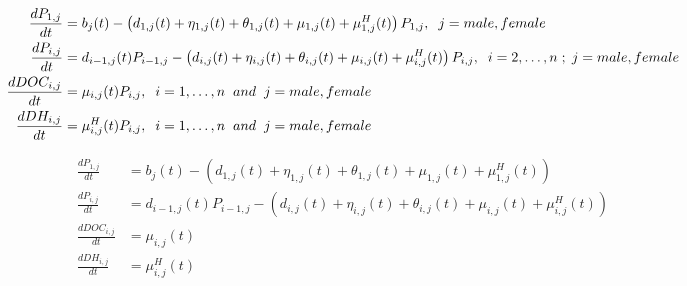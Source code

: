 \documentclass[
]{jss}
\begin{document}
\begin{small}
\begin{equation}\label{eq:si_hp_ode}
\begin{split}
\frac{dP_{1, j}}{dt} & = b_{j}(t) - \left(d_{1, j}(t)+ \eta_{1, j}(t) + \theta_{1, j}(t) + \mu_{1, j}(t) + \mu_{1, j}^{H}(t)\right) P_{1, j},  \hspace{0.2cm} j = male, female\\
\frac{dP_{i, j}}{dt} & = d_{i-1, j}(t)P_{i-1, j} - \left(d_{i, j}(t) + \eta_{i, j}(t) +         \theta_{i, j}(t) + \mu_{i, j}(t) + \mu_{i, j}^{H}(t)\right) P_{i, j}, \hspace{0.2cm} i=2,\ldots,n \hspace{0.1cm} ; \hspace{0.1cm} j = male, female \\
\frac{dDOC_{i, j}}{dt} & = \mu_{i, j}(t) P_{i, j}, \hspace{0.2cm} i = 1,\ldots, n \hspace{0.2cm} and \hspace{0.2cm} j = male, female \\ %
\frac{dDH_{i, j}}{dt} & = \mu^{H}_{i, j}(t) P_{i, j}, \hspace{0.2cm} i = 1, \ldots, n  \hspace{0.2cm} and \hspace{0.2cm} j = male, female %
\end{split}
\end{equation}
\end{small}

\begin{small}
\begin{equation}\label{eq:si_hp_ode}
\begin{split}
\frac{dP_{1, j}}{dt} & = b_{j}(t) - \left(d_{1, j}(t)+ \eta_{1, j}(t) + \theta_{1, j}(t) + \mu_{1, j}(t) + \mu_{1, j}^{H}(t)\right) \\
\frac{dP_{i, j}}{dt} & = d_{i-1, j}(t)P_{i-1, j} - \left(d_{i, j}(t) + \eta_{i, j}(t) +         \theta_{i, j}(t) + \mu_{i, j}(t) + \mu_{i, j}^{H}(t)\right) \\
\frac{dDOC_{i, j}}{dt} & = \mu_{i, j}(t) \\
\frac{dDH_{i, j}}{dt} & = \mu^{H}_{i, j}(t) \\
\end{split}
\end{equation}
\end{small}
\end{document}
